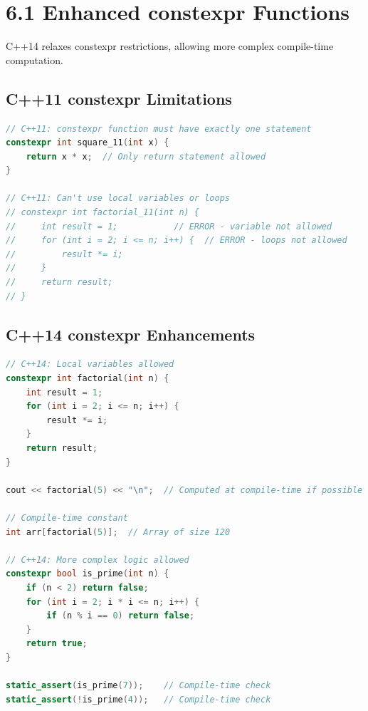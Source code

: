 \hypertarget{enhanced-constexpr-functions}{%
\section{6.1 Enhanced constexpr
Functions}\label{enhanced-constexpr-functions}}

C++14 relaxes constexpr restrictions, allowing more complex compile-time
computation.

\hypertarget{c11-constexpr-limitations}{%
\subsection{C++11 constexpr
Limitations}\label{c11-constexpr-limitations}}

\begin{lstlisting}[language={C++}]
// C++11: constexpr function must have exactly one statement
constexpr int square_11(int x) {
    return x * x;  // Only return statement allowed
}

// C++11: Can't use local variables or loops
// constexpr int factorial_11(int n) {
//     int result = 1;           // ERROR - variable not allowed
//     for (int i = 2; i <= n; i++) {  // ERROR - loops not allowed
//         result *= i;
//     }
//     return result;
// }
\end{lstlisting}

\hypertarget{c14-constexpr-enhancements}{%
\subsection{C++14 constexpr
Enhancements}\label{c14-constexpr-enhancements}}

\begin{lstlisting}[language={C++}]
// C++14: Local variables allowed
constexpr int factorial(int n) {
    int result = 1;
    for (int i = 2; i <= n; i++) {
        result *= i;
    }
    return result;
}

cout << factorial(5) << "\n";  // Computed at compile-time if possible

// Compile-time constant
int arr[factorial(5)];  // Array of size 120

// C++14: More complex logic allowed
constexpr bool is_prime(int n) {
    if (n < 2) return false;
    for (int i = 2; i * i <= n; i++) {
        if (n % i == 0) return false;
    }
    return true;
}

static_assert(is_prime(7));    // Compile-time check
static_assert(!is_prime(4));   // Compile-time check
\end{lstlisting}

